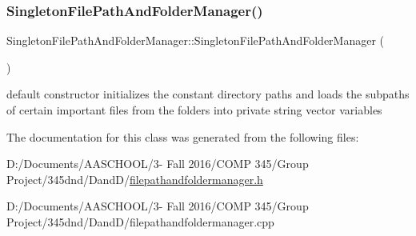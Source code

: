 \subsubsection{\texorpdfstring{Singleton\+File\+Path\+And\+Folder\+Manager()}{SingletonFilePathAndFolderManager()}}
{\footnotesize\ttfamily Singleton\+File\+Path\+And\+Folder\+Manager\+::\+Singleton\+File\+Path\+And\+Folder\+Manager (\begin{DoxyParamCaption}{ }\end{DoxyParamCaption})}

default constructor initializes the constant directory paths and loads the subpaths of certain important files from the folders into private string vector variables 

The documentation for this class was generated from the following files\+:\begin{DoxyCompactItemize}
\item 
D\+:/\+Documents/\+A\+A\+S\+C\+H\+O\+O\+L/3-\/ Fall 2016/\+C\+O\+M\+P 345/\+Group Project/345dnd/\+Dand\+D/\hyperlink{filepathandfoldermanager_8h}{filepathandfoldermanager.\+h}\item 
D\+:/\+Documents/\+A\+A\+S\+C\+H\+O\+O\+L/3-\/ Fall 2016/\+C\+O\+M\+P 345/\+Group Project/345dnd/\+Dand\+D/filepathandfoldermanager.\+cpp\end{DoxyCompactItemize}
